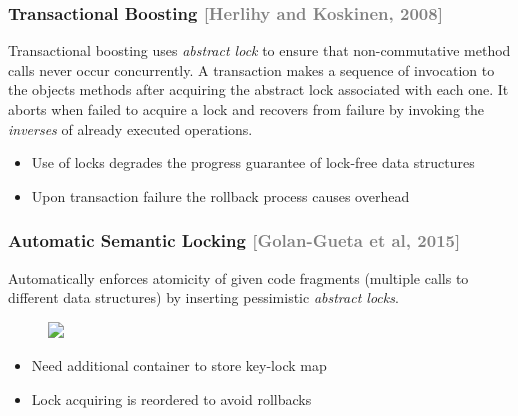 \documentclass{beamer}
\begin{document}
\begin{frame} \frametitle{Transactional Boosting \textcolor{gray}{[Herlihy and Koskinen, 2008]}}
    \begin{block}{}
        \small
        Transactional boosting uses \emph{abstract lock} to ensure that non-commutative method calls never occur concurrently. A transaction makes a sequence of invocation to the objects methods after acquiring the abstract lock associated with each one. It aborts when failed to acquire a lock and recovers from failure by invoking the \emph{inverses} of already executed operations.
    \end{block}
    \begin{itemize}
        \item<1-> Use of locks degrades the progress guarantee of lock-free data structures 
        \item<2> Upon transaction failure the rollback process causes overhead
    \end{itemize}
    \begin{overlayarea}{\textwidth}{.40\textheight}
        \centering
    \end{overlayarea}
\end{frame}

\begin{frame} \frametitle{Automatic Semantic Locking \textcolor{gray}{[Golan-Gueta et al, 2015]}}
    \begin{block}{}
        \small
        Automatically enforces atomicity of given code fragments (multiple calls to different data structures) by inserting pessimistic \emph{abstract locks}.
    \end{block}
    \begin{figure}[h]
        \centering
        \includegraphics<1->[width=1\textwidth]{lock-inference.png}
    \end{figure}
    \begin{itemize}
        \item<2> Need additional container to store key-lock map
        \item<2> Lock acquiring is reordered to avoid rollbacks 
    \end{itemize}

\end{frame}
\end{document}
